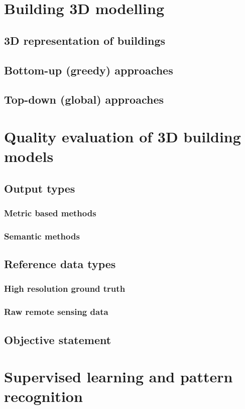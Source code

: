 \minitoc
\section{Building 3D modelling}
    \subsection{3D representation of buildings}
    \subsection{Bottom-up (greedy) approaches}
    \subsection{Top-down (global) approaches}
\section{Quality evaluation of 3D building models}
    \subsection{Output types}
        \subsubsection{Metric based methods}
        \subsubsection{Semantic methods}
    \subsection{Reference data types}
        \subsubsection{High resolution ground truth}
        \subsubsection{Raw remote sensing data}
    \subsection{Objective statement}
\section{Supervised learning and pattern recognition}
